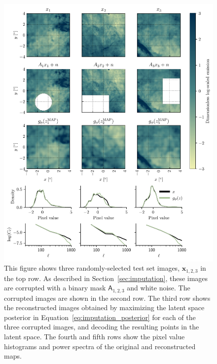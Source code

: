 \documentclass[fleqn,usenatbib]{mnras}
\begin{document}
\begin{figure}[p]
    \centering
    \includegraphics{ ./data_imputation_panel_plot.pdf}
    \caption{This figure shows three randomly-selected test set images, $\mathbf x_{1, 2, 3}$ in the top row. As described in Section~\ref{sec:imputation}, these images are corrupted with a binary mask $\mathsf A_{1, 2, 3}$ and white noise. The corrupted images are shown in the second row. The third row shows the reconstructed images obtained by maximizing the latent space posterior in Equation~\ref{eq:imputation_posterior} for each of the three corrupted images, and decoding the resulting points in the latent space. The fourth and fifth rows show the pixel value histograms and power spectra of the original and reconstructed maps.}
    \label{fig:data_imputation} 
\end{figure}
\end{document}
